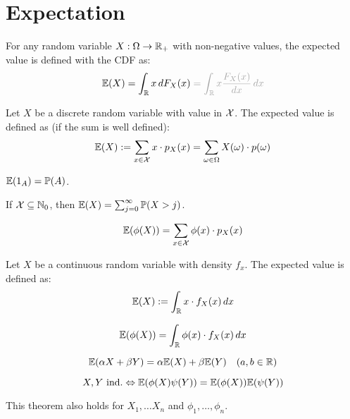 \section{Expectation}

For any random variable \(X: \Omega \to \mathbb{R}_+\) with non-negative values, the expected value is defined with the CDF as:
\[\E(X) = \int_\R x \,dF_X(x) \color{gray!70} = \int_\R x \frac{F_X(x)}{dx} \, dx\]

\begin{ddefinition*}
  Let \(X\) be a discrete random variable with value in \(\operatorname{\mathcal{X}}\). The expected value is defined as (if the sum is well defined):
  \[\mathbb{E}(X) := \sum_{x \in \operatorname{\mathcal{X}}}x \cdot p_X(x) = \sum_{\omega \in \Omega} X(\omega) \cdot p(\omega)\]
\end{ddefinition*}

\begin{proposition}
  {\small \(\mathbb{E}(1_A) = \mathbb{P}(A)\)}.
\end{proposition}

\begin{proposition}
  If \(\operatorname{\mathcal{X}} \subseteq \mathbb{N}_0\), then \(\mathbb{E}(X) = \sum_{j=0}^\infty \mathbb{P}(X > j)\).
\end{proposition}

\begin{dtheorem*} \vspace{-5pt}
  \[\mathbb{E}(\phi(X)) = \sum_{x \in \operatorname{\mathcal{X}}}\phi(x) \cdot p_X(x)\]
\end{dtheorem*}

\begin{cdefinition*}
  Let \(X\) be a continuous random variable with density \(f_x\). The expected value is defined as:
  \[\mathbb{E}(X) := \int_{\mathbb{R}} x \cdot f_X(x) \,dx\]
\end{cdefinition*}

\begin{ctheorem*}[LOTUS] \vspace{-5pt}
  \[\mathbb{E}(\phi(X)) = \int_{\mathbb{R}} \phi(x) \cdot f_X(x) \, dx\]
\end{ctheorem*}

\begin{theorem*} \vspace{-5pt}
  \[\mathbb{E}(\alpha X + \beta Y) = \alpha \mathbb{E}(X) + \beta \mathbb{E}(Y) \quad (a, b \in \mathbb{R})\]
\end{theorem*}

\begin{theorem*} \vspace{-5pt}
  \[X, Y \ \text{ind.} \Leftrightarrow \mathbb{E}(\phi(X) \psi(Y)) = \mathbb{E}(\phi(X)) \mathbb{E}(\psi(Y))\]
\end{theorem*}
This theorem also holds for \(X_1, \ldots X_n\) and \(\phi_1, \ldots, \phi_n\).


